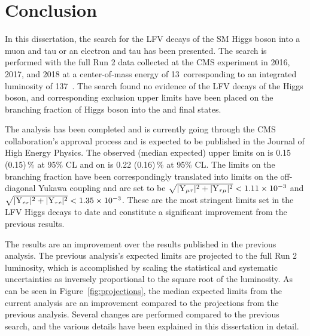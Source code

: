 %
%

\chapter{Conclusion}
\label{conclusion}

In this dissertation, the search for the LFV decays of the SM Higgs boson into a muon and tau or an electron and tau has been presented. The search is performed with the full Run 2 data collected at the CMS experiment in 2016, 2017, and 2018 at a center-of-mass energy of 13~\TeV corresponding to an integrated luminosity of 137~\fb. The search found no evidence of the LFV decays of the Higgs boson, and corresponding exclusion upper limits have been placed on the branching fraction of Higgs boson into the \mutau and \etau final states.

The analysis has been completed and is currently going through the CMS collaboration's approval process and is expected to be published in the Journal of High Energy Physics. The observed (median expected) upper limits on \BHmt is 0.15 (0.15)\,\% at 95\% CL and on \BHet is 0.22 (0.16)\,\% at 95\% CL. The limits on the branching fraction have been correspondingly translated into limits on the off-diagonal Yukawa coupling and are set to be $\sqrt{|\text{Y}_{\mu\tau}|^{2}+|\text{Y}_{\tau\mu}|^{2}} < 1.11 \times 10^{-3}$ and $\sqrt{|\text{Y}_{\textit{e}\tau}|^{2}+|\text{Y}_{\tau\textit{e}}|^{2}} < 1.35 \times 10^{-3}$. These are the most stringent limits set in the LFV Higgs decays to date and constitute a significant improvement from the previous results.

The results are an improvement over the results published in the previous analysis. The previous analysis's expected limits are projected to the full Run 2 luminosity, which is accomplished by scaling the statistical and systematic uncertainties as inversely proportional to the square root of the luminosity. As can be seen in Figure~\ref{fig:projections}, the median expected limits from the current analysis are an improvement compared to the projections from the previous analysis. Several changes are performed compared to the previous search, and the various details have been explained in this dissertation in detail.

